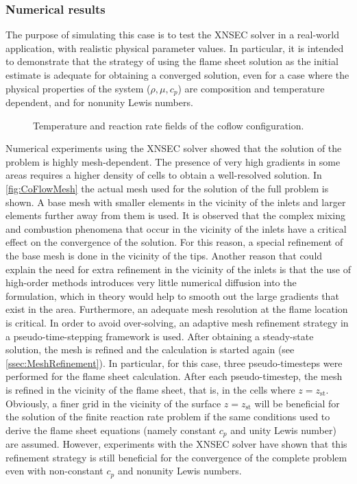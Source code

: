 \subsubsection{Numerical results}
The purpose of simulating this case is to test the XNSEC solver in a real-world application, with realistic physical parameter values. In particular, it is intended to demonstrate that the strategy of using the flame sheet solution as the initial estimate is adequate for obtaining a converged solution, even for a case where the physical properties of the system ($\rho, \mu, c_p$) are composition and temperature dependent, and for nonunity Lewis numbers. 
\begin{figure}[t!]
	\centering
	\pgfplotsset{width=0.6\textwidth, compat=1.3}
	\hspace{-2.4cm} 	
	\caption{Temperature and reaction rate fields of the coflow configuration.} \label{fig:CoFlowFlameFig}
\end{figure}
Numerical experiments using the XNSEC solver showed that the solution of the problem is highly mesh-dependent. The presence of very high gradients in some areas requires a higher density of cells to obtain a well-resolved solution.  In \cref{fig:CoFlowMesh} the actual mesh used for the solution of the full problem is shown.  A base mesh with smaller elements in the vicinity of the inlets and larger elements further away from them is used. It is observed that the complex mixing and combustion phenomena that occur in the vicinity of the inlets have a critical effect on the convergence of the solution. For this reason, a special refinement of the base mesh is done in the vicinity of the tips. Another reason that could explain the need for extra refinement in the vicinity of the inlets is that the use of high-order methods introduces very little numerical diffusion into the formulation, which in theory would help to smooth out the large gradients that exist in the area. Furthermore, an adequate mesh resolution  at the flame location is critical. In order to avoid over-solving, an adaptive mesh refinement strategy in a pseudo-time-stepping framework is used. After obtaining a steady-state solution, the mesh is refined and the calculation is started again (see \cref{ssec:MeshRefinement}). In particular, for this case, three pseudo-timesteps were performed for the flame sheet calculation. After each pseudo-timestep, the mesh is refined in the vicinity of the flame sheet, that is, in the cells where $z = z_{\text{st}}$. 
Obviously, a finer grid in the vicinity of the surface $z = z_{\text{st}}$ will be beneficial for the solution of the finite reaction rate problem if the same conditions used to derive the flame sheet equations (namely constant $c_p$ and unity Lewis number) are assumed.  
However, experiments with the XNSEC solver have shown that this refinement strategy is still beneficial for the convergence of the complete problem even with non-constant $c_p$ and nonunity Lewis numbers.


